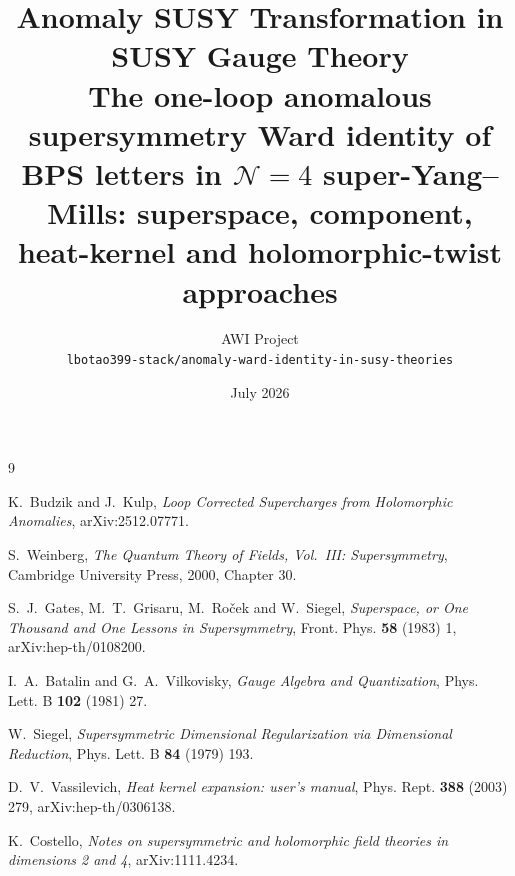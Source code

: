 \documentclass[11pt,a4paper]{article}
\title{\textbf{Anomaly SUSY Transformation in SUSY Gauge Theory}\\[4pt]
\large The one-loop anomalous supersymmetry Ward identity of BPS letters in
$\mathcal N=4$ super-Yang--Mills: superspace, component, heat-kernel and
holomorphic-twist approaches}
\author{AWI Project\\ \small\texttt{lbotao399-stack/anomaly-ward-identity-in-susy-theories}}
\date{July 2026}
\numberwithin{equation}{section}
\theoremstyle{plain}
\theoremstyle{definition}
\theoremstyle{remark}
\begin{document}
\maketitle

\begin{abstract}

\end{abstract}

\tableofcontents
\bigskip


















\appendix


\begin{thebibliography}{9}

K.~Budzik and J.~Kulp,
\textit{Loop Corrected Supercharges from Holomorphic Anomalies},
arXiv:2512.07771.

S.~Weinberg,
\textit{The Quantum Theory of Fields, Vol.~III: Supersymmetry},
Cambridge University Press, 2000, Chapter 30.

S.~J.~Gates, M.~T.~Grisaru, M.~Ro\v{c}ek and W.~Siegel,
\textit{Superspace, or One Thousand and One Lessons in Supersymmetry},
Front. Phys. \textbf{58} (1983) 1, arXiv:hep-th/0108200.

I.~A.~Batalin and G.~A.~Vilkovisky,
\textit{Gauge Algebra and Quantization},
Phys. Lett. B \textbf{102} (1981) 27.

W.~Siegel,
\textit{Supersymmetric Dimensional Regularization via Dimensional Reduction},
Phys. Lett. B \textbf{84} (1979) 193.

D.~V.~Vassilevich,
\textit{Heat kernel expansion: user's manual},
Phys. Rept. \textbf{388} (2003) 279, arXiv:hep-th/0306138.

K.~Costello,
\textit{Notes on supersymmetric and holomorphic field theories in dimensions 2 and 4},
arXiv:1111.4234.

\end{thebibliography}
\end{document}
